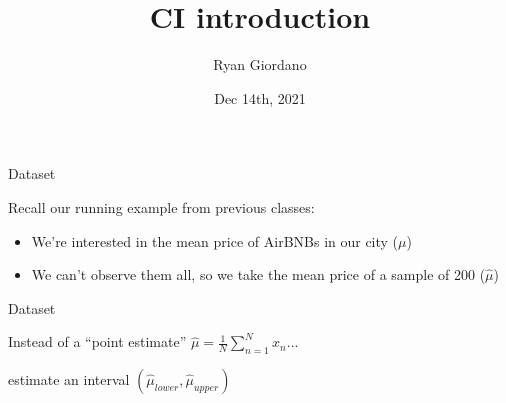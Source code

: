 \documentclass[8pt]{beamer}\usepackage[]{graphicx}\usepackage[]{color}
\title{CI introduction}
\author{Ryan Giordano}
\date{Dec 14th, 2021}
\institute{Massachusetts Institute of Technology}
\begin{document}

\begin{frame}[fragile]{Dataset}

Recall our running example from previous classes:\footnotemark[1]

\begin{itemize}
    \item We're interested in the mean price of AirBNBs in our city ($\mu$)
    \item We can't observe them all, so we take the mean
          price of a sample of 200 ($\hat\mu$)
\end{itemize}


\begin{center}
\begin{minipage}{0.9\textwidth}
\end{minipage}
\end{center}

\vfill
{}

\end{frame}





\begin{frame}[t, fragile]{Dataset}

Instead of a ``point estimate'' $\hat\mu = \frac{1}{N} \sum_{n=1}^N x_n$...

estimate an interval $(\hat\mu_{lower}, \hat\mu_{upper})$


\begin{center}
\begin{minipage}{0.9\textwidth}
\end{minipage}
\end{center}

\end{frame}



%
%
%
\end{document}

